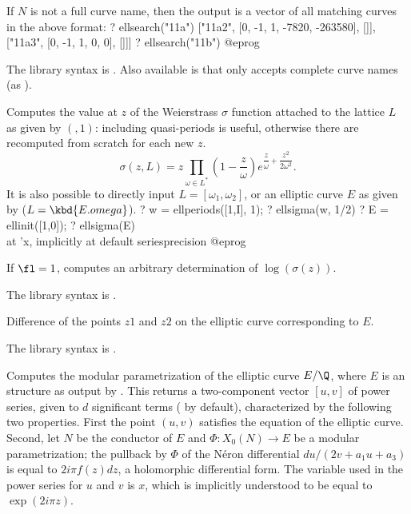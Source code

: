 If $N$ is not a full curve name, then the output is a vector of all matching
curves in the above format:
\bprog
? ellsearch("11a")
      ["11a2", [0, -1, 1, -7820, -263580], []],
      ["11a3", [0, -1, 1, 0, 0], []]]
? ellsearch("11b")
@eprog

The library syntax is .
Also available is  that only
accepts complete curve names (as ).

\label{se:ellsigma}
Computes the value at $z$ of the Weierstrass $\sigma$ function attached to
the lattice $L$ as given by $(,1)$: including quasi-periods
is useful, otherwise there are recomputed from scratch for each new $z$.
$$ \sigma(z, L) = z \prod_{\omega\in L^*} \left(1 -
\dfrac{z}{\omega}\right)e^{\dfrac{z}{\omega} + \dfrac{z^2}{2\omega^2}}.$$
It is also possible to directly input $L = [\omega_1,\omega_2]$,
or an elliptic curve $E$ as given by  ($L = \kbd{E.omega}$).
\bprog
? w = ellperiods([1,I], 1);
? ellsigma(w, 1/2)
? E = ellinit([1,0]);
? ellsigma(E) \\ at 'x, implicitly at default seriesprecision
@eprog

If $\fl=1$, computes an arbitrary determination of $\log(\sigma(z))$.

The library syntax is .

\label{se:ellsub}
Difference of the points $z1$ and $z2$ on the
elliptic curve corresponding to $E$.

The library syntax is .

\label{se:elltaniyama}
Computes the modular parametrization of the elliptic curve $E/\Q$,
where $E$ is an  structure as output by . This returns
a two-component vector $[u,v]$ of power series, given to $d$ significant
terms ( by default), characterized by the following two
properties. First the point $(u,v)$ satisfies the equation of the elliptic
curve. Second, let $N$ be the conductor of $E$ and $\Phi: X_0(N)\to E$
be a modular parametrization; the pullback by $\Phi$ of the
N\'eron differential $du/(2v+a_1u+a_3)$ is equal to $2i\pi
f(z)dz$, a holomorphic differential form. The variable used in the power
series for $u$ and $v$ is $x$, which is implicitly understood to be equal to
$\exp(2i\pi z)$.

